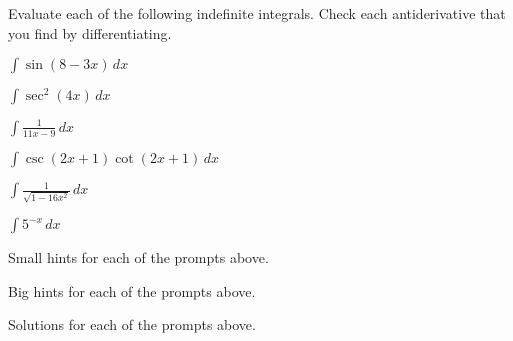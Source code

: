 \begin{activity} \label{A:5.3.1}  Evaluate each of the following indefinite integrals.  Check each antiderivative that you find by differentiating.
\ba
	\item $\int \sin(8-3x) \, dx$
	\item $\int \sec^2 (4x) \, dx$
	\item $\int \frac{1}{11x - 9} \, dx$
	\item $\int \csc(2x+1) \cot(2x+1) \, dx$
	\item $\int \frac{1}{\sqrt{1-16x^2}}\, dx$
	\item $\int 5^{-x}\, dx$
\ea
\end{activity}
\begin{smallhint}
\ba
	\item Small hints for each of the prompts above.
\ea
\end{smallhint}
\begin{bighint}
\ba
	\item Big hints for each of the prompts above.
\ea
\end{bighint}
\begin{activitySolution}
\ba
	\item Solutions for each of the prompts above.
\ea
\end{activitySolution}
\aftera